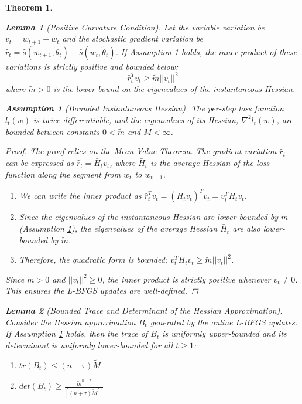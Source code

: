 \documentclass[a4paper,12pt]{article}
\newtheorem{theorem}{Theorem}
\newtheorem{lemma}{Lemma}
\newtheorem{assumption}{Assumption}
\begin{document}
\begin{theorem}
\begin{lemma}[Positive Curvature Condition]
\label{lem:positive-curvature}
Let the variable variation be $v_t = w_{t+1} - w_t$ and the stochastic gradient variation be $\hat{r}_t = \hat{s}(w_{t+1}, \tilde{\theta}_t) - \hat{s}(w_t, \tilde{\theta}_t)$. If Assumption \ref{assum:bounded-hessian} holds, the inner product of these variations is strictly positive and bounded below:
$$
\hat{r}_t^T v_t \ge \tilde{m} ||v_t||^2
$$
where $\tilde{m} > 0$ is the lower bound on the eigenvalues of the instantaneous Hessian.
\end{lemma}

\begin{assumption}[Bounded Instantaneous Hessian]
\label{assum:bounded-hessian}
The per-step loss function $l_t(w)$ is twice differentiable, and the eigenvalues of its Hessian, $\nabla^2 l_t(w)$, are bounded between constants $0 < \tilde{m}$ and $\tilde{M} < \infty$.
\end{assumption}

\begin{proof}
The proof relies on the Mean Value Theorem. The gradient variation $\hat{r}_t$ can be expressed as $\hat{r}_t = \bar{H}_t v_t$, where $\bar{H}_t$ is the average Hessian of the loss function along the segment from $w_t$ to $w_{t+1}$.
\begin{enumerate}
    \item We can write the inner product as $\hat{r}_t^T v_t = ( \bar{H}_t v_t)^T v_t = v_t^T \bar{H}_t v_t$.
    
    \item Since the eigenvalues of the instantaneous Hessian are lower-bounded by $\tilde{m}$ (Assumption \ref{assum:bounded-hessian}), the eigenvalues of the average Hessian $\bar{H}_t$ are also lower-bounded by $\tilde{m}$.
    
    \item Therefore, the quadratic form is bounded: $v_t^T \bar{H}_t v_t \ge \tilde{m} ||v_t||^2$.
\end{enumerate}
Since $\tilde{m} > 0$ and $||v_t||^2 \ge 0$, the inner product is strictly positive whenever $v_t \neq 0$. This ensures the L-BFGS updates are well-defined.
\end{proof}

\begin{lemma}[Bounded Trace and Determinant of the Hessian Approximation]
\label{lem:trace-det-bound}
Consider the Hessian approximation $B_t$ generated by the online L-BFGS updates. If Assumption \ref{assum:bounded-hessian} holds, then the trace of $B_t$ is uniformly upper-bounded and its determinant is uniformly lower-bounded for all $t \ge 1$:
\begin{enumerate}
    \item $tr(B_t) \le (n+\tau)\tilde{M}$
    \item $det(B_t) \ge \frac{\tilde{m}^{n+\tau}}{[(n+\tau)\tilde{M}]^{\tau}}$
\end{enumerate}
\end{lemma}


\end{theorem}
\end{document}
